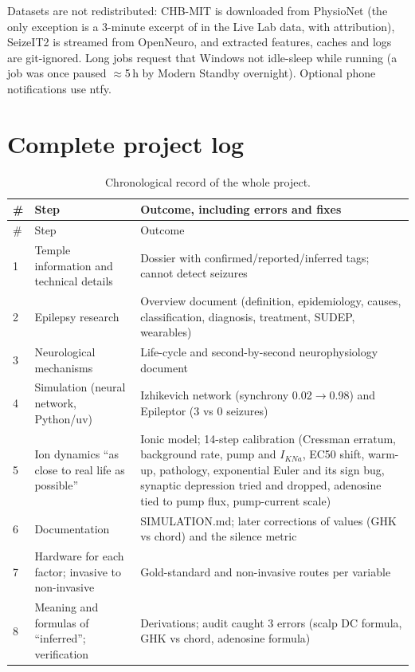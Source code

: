 Datasets are not redistributed: CHB-MIT is downloaded from PhysioNet (the only exception is a 3-minute excerpt of  in the Live Lab data, with attribution), SeizeIT2 is streamed from OpenNeuro, and extracted features, caches and logs are git-ignored. Long jobs request that Windows not idle-sleep while running (a job was once paused $\approx$5\,h by Modern Standby overnight). Optional phone notifications use ntfy.

\section{Complete project log}
\label{app:log}

\begin{longtable}{@{}p{0.5cm} p{4.4cm} p{10.2cm}@{}}
\caption{Chronological record of the whole project.}\\
\toprule
\# & Step & Outcome, including errors and fixes \\
\midrule
\endfirsthead
\toprule
\# & Step & Outcome \\
\midrule
\endhead
1 & Temple information and technical details & Dossier with confirmed/reported/inferred tags; cannot detect seizures \\
2 & Epilepsy research & Overview document (definition, epidemiology, causes, classification, diagnosis, treatment, SUDEP, wearables) \\
3 & Neurological mechanisms & Life-cycle and second-by-second neurophysiology document \\
4 & Simulation (neural network, Python/uv) & Izhikevich network (synchrony 0.02$\to$0.98) and Epileptor (3 vs 0 seizures) \\
5 & Ion dynamics ``as close to real life as possible'' & Ionic model; 14-step calibration (Cressman erratum, background rate, pump and $I_{KNa}$, EC50 shift, warm-up, pathology, exponential Euler and its sign bug, synaptic depression tried and dropped, adenosine tied to pump flux, pump-current scale) \\
6 & Documentation & SIMULATION.md; later corrections of \EGABA{} values (GHK vs chord) and the silence metric \\
7 & Hardware for each factor; invasive to non-invasive & Gold-standard and non-invasive routes per variable \\
8 & Meaning and formulas of ``inferred''; verification & Derivations; audit caught 3 errors (scalp DC formula, GHK vs chord, adenosine formula) \\

\end{longtable}
